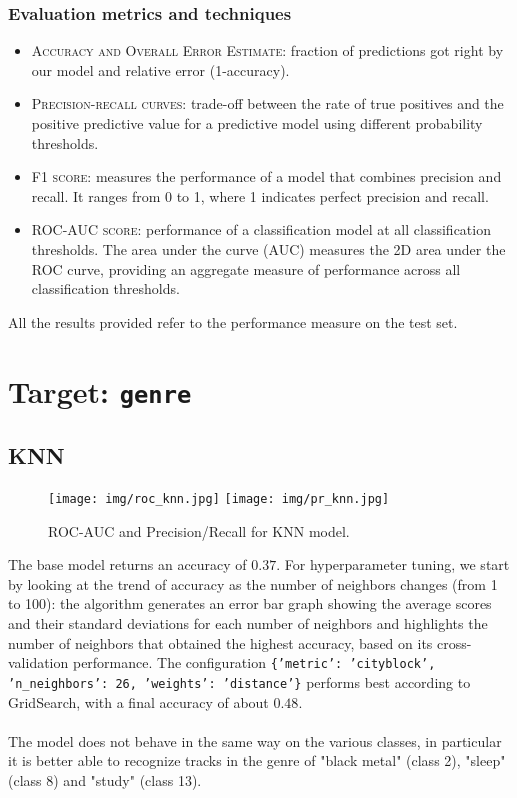 \subsubsection*{Evaluation metrics and techniques}
\begin{itemize}
    \item \textsc{Accuracy and Overall Error Estimate}: fraction of predictions got right by our model and relative error (1-accuracy).
    \item \textsc{Precision-recall curves}: trade-off between the rate of true positives and the positive predictive value for a predictive model using different probability thresholds.
    \item \textsc{F1 score}: measures the performance of a model that combines precision and recall. It ranges from 0 to 1, where 1 indicates perfect precision and recall. 
    \item \textsc{ROC-AUC score}: performance of a classification model at all classification thresholds. The area under the curve (AUC) measures the 2D area under the ROC curve, providing an aggregate measure of performance across all classification thresholds.
\end{itemize}
All the results provided refer to the performance measure on the test set.
\newpage
\section{Target: \texttt{genre}}
\vspace{-0.5cm}
\subsection{KNN}
\begin{wrapfigure}{r}{0.4\textwidth}
\centering
\vspace{-2cm}
\caption{ROC-AUC and Precision/Recall for KNN model.}
\texttt{[image: img/roc\_knn.jpg]}
\vspace{2cm}
\texttt{[image: img/pr\_knn.jpg]}
\vspace{-3cm}
\end{wrapfigure}

The base model returns an accuracy of $0.37$. For hyperparameter tuning, we start by looking at the trend of accuracy as the number of neighbors changes (from 1 to 100): the algorithm generates an error bar graph showing the average scores and their standard deviations for each number of neighbors and highlights the number of neighbors that obtained the highest accuracy, based on its cross-validation performance.
The configuration \texttt{\{'metric': 'cityblock', 'n\_neighbors': 26, 'weights': 'distance'\}} performs best according to GridSearch, with a final accuracy of about $0.48$.\\
\\
The model does not behave in the same way on the various classes, in particular it is better able to recognize tracks in the genre of "black metal" (class 2), "sleep" (class 8) and "study" (class 13).
\vspace{-0.5cm}
